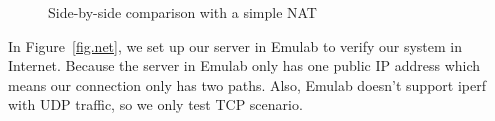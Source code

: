 \begin{figure}[htb]
\caption{Side-by-side comparison with a simple NAT}
\label{fig.nat}
\end{figure}


In Figure~\ref{fig.net}, we set up our server in Emulab to verify our system in Internet. Because the server in Emulab only has one public IP address which means our connection only has two paths. Also, Emulab doesn't support iperf with UDP traffic, so we only test TCP scenario.

